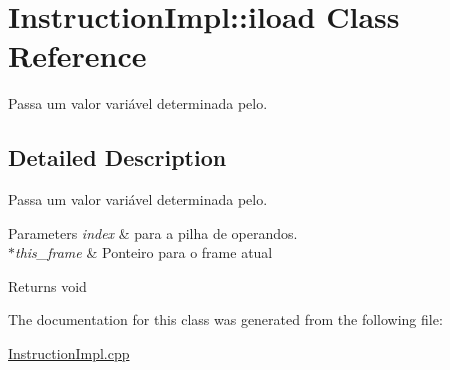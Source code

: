 \hypertarget{class_instruction_impl_1_1iload}{}\section{Instruction\+Impl\+:\+:iload Class Reference}
\label{class_instruction_impl_1_1iload}


Passa um valor variável determinada pelo.  




\subsection{Detailed Description}
Passa um valor variável determinada pelo. 


\begin{DoxyParams}{Parameters}
{\em index} & para a pilha de operandos. \\
\hline
{\em $\ast$this\+\_\+frame} & Ponteiro para o frame atual \\
\hline
\end{DoxyParams}
\begin{DoxyReturn}{Returns}
void 
\end{DoxyReturn}


The documentation for this class was generated from the following file\+:\begin{DoxyCompactItemize}
\item 
\hyperlink{_instruction_impl_8cpp}{Instruction\+Impl.\+cpp}\end{DoxyCompactItemize}
